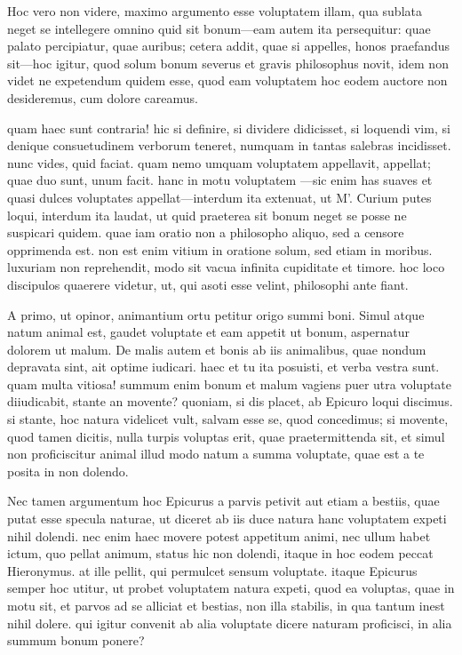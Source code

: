  Hoc vero non videre, maximo argumento esse voluptatem illam, qua sublata neget se intellegere omnino quid sit bonum—eam autem ita persequitur: quae palato percipiatur, quae auribus; cetera addit, quae si appelles, honos praefandus sit—hoc igitur, quod solum bonum severus et gravis philosophus novit, idem non videt ne expetendum quidem esse, quod eam voluptatem hoc eodem auctore non desideremus, cum dolore careamus.

 quam haec sunt contraria! hic si definire, si dividere didicisset, si loquendi vim, si denique consuetudinem verborum teneret, numquam in tantas salebras incidisset. nunc vides, quid faciat. quam nemo umquam voluptatem appellavit, appellat; quae duo sunt, unum facit. hanc in motu voluptatem —sic enim has suaves et quasi dulces voluptates appellat—interdum ita extenuat, ut M'. Curium putes loqui, interdum ita laudat, ut quid praeterea sit bonum neget se posse ne suspicari quidem. quae iam oratio non a philosopho aliquo, sed a censore opprimenda est. non est enim vitium in oratione solum, sed etiam in moribus. luxuriam non reprehendit, modo sit vacua infinita cupiditate et timore. hoc loco discipulos quaerere videtur, ut, qui asoti esse velint, philosophi ante fiant.

 A primo, ut opinor, animantium ortu petitur origo summi boni. Simul atque natum animal est, gaudet voluptate et eam appetit ut bonum, aspernatur dolorem ut malum. De malis autem et bonis ab iis animalibus, quae nondum depravata sint, ait optime iudicari. haec et tu ita posuisti, et verba vestra sunt. quam multa vitiosa! summum enim bonum et malum vagiens puer utra voluptate diiudicabit, stante an movente? quoniam, si dis placet, ab Epicuro loqui discimus. si stante, hoc natura videlicet vult, salvam esse se, quod concedimus; si movente, quod tamen dicitis, nulla turpis voluptas erit, quae praetermittenda sit, et simul non proficiscitur animal illud modo natum a summa voluptate, quae est a te posita in non dolendo.

 Nec tamen argumentum hoc Epicurus a parvis petivit aut etiam a bestiis, quae putat esse specula naturae, ut diceret ab iis duce natura hanc voluptatem expeti nihil dolendi. nec enim haec movere potest appetitum animi, nec ullum habet ictum, quo pellat animum, status hic non dolendi, itaque in hoc eodem peccat Hieronymus. at ille pellit, qui permulcet sensum voluptate. itaque Epicurus semper hoc utitur, ut probet voluptatem natura expeti, quod ea voluptas, quae in motu sit, et parvos ad se alliciat et bestias, non illa stabilis, in qua tantum inest nihil dolere. qui igitur convenit ab alia voluptate dicere naturam proficisci, in alia summum bonum ponere?

